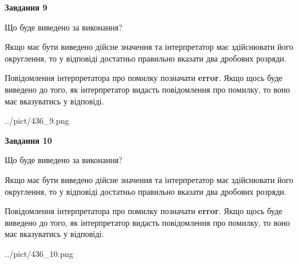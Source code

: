 \documentclass[12pt, ukrainian]{article}
\begin{document}
{\begin {Large}
{\begin {center}\textbf{Завдання 9}\end {center}}\par
Що буде виведено за виконання? \par

Якщо має бути виведено дійсне значення та інтерпретатор має здійснювати його округлення, 
то у відповіді достатньо правильно вказати два дробових розряди.

Повідомлення інтерпретатора про помилку позначати \textbf{error}.
Якщо щось буде виведено до того, як інтерпретатор видасть повідомлення про помилку, 
то воно має вказуватись у відповіді. \par

\begin{center}
	{../pict/436_9.png}
\end{center}
\newpage

{\begin {center}\textbf{Завдання 10}\end {center}}\par
Що буде виведено за виконання? \par

Якщо має бути виведено дійсне значення та інтерпретатор має здійснювати його округлення, 
то у відповіді достатньо правильно вказати два дробових розряди.

Повідомлення інтерпретатора про помилку позначати \textbf{error}.
Якщо щось буде виведено до того, як інтерпретатор видасть повідомлення про помилку, 
то воно має вказуватись у відповіді. \par

\begin{center}
	{../pict/436_10.png}
\end{center}
\newpage

\end {Large}}
\end{document}
